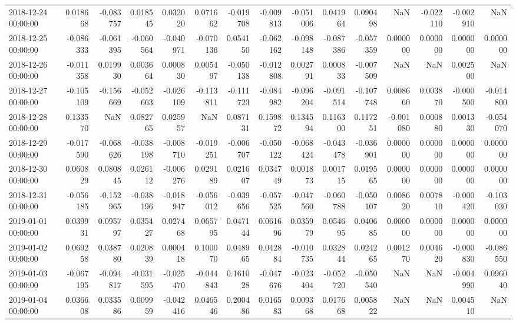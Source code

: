 \begin{tabular}{lrrrrrrrrrrrrrr}
2018-12-24 00:00:00 & 0.018668 & -0.083757 & 0.018545 & 0.032020 & 0.071662 & -0.019708 & -0.009813 & -0.051006 & 0.041964 & 0.090498 & NaN & -0.022110 & -0.002910 & NaN \\
2018-12-25 00:00:00 & -0.086333 & -0.061395 & -0.060564 & -0.040971 & -0.070136 & 0.054150 & -0.062162 & -0.098148 & -0.087386 & -0.057359 & 0.000000 & 0.000000 & 0.000000 & 0.000000 \\
2018-12-26 00:00:00 & -0.011358 & 0.019930 & 0.003664 & 0.000830 & 0.005497 & -0.050138 & -0.012808 & 0.002791 & 0.000833 & -0.007509 & NaN & NaN & 0.002500 & NaN \\
2018-12-27 00:00:00 & -0.105109 & -0.156669 & -0.052663 & -0.026109 & -0.113811 & -0.111723 & -0.084982 & -0.096204 & -0.091514 & -0.107748 & 0.008660 & 0.003870 & -0.000500 & -0.014800 \\
2018-12-28 00:00:00 & 0.133570 & NaN & 0.082765 & 0.025957 & NaN & 0.087131 & 0.159872 & 0.134594 & 0.116300 & 0.117251 & -0.001080 & 0.000880 & 0.001330 & -0.054070 \\
2018-12-29 00:00:00 & -0.017590 & -0.068626 & -0.038198 & -0.008710 & -0.019251 & -0.006707 & -0.050122 & -0.068424 & -0.043478 & -0.036901 & 0.000000 & 0.000000 & 0.000000 & 0.000000 \\
2018-12-30 00:00:00 & 0.060829 & 0.080845 & 0.026112 & -0.006276 & 0.029189 & 0.021607 & 0.034749 & 0.001873 & 0.001715 & 0.019565 & 0.000000 & 0.000000 & 0.000000 & 0.000000 \\
2018-12-31 00:00:00 & -0.056185 & -0.152965 & -0.038196 & -0.018947 & -0.056012 & -0.039656 & -0.057525 & -0.047560 & -0.060788 & -0.050107 & 0.008620 & 0.007810 & -0.000420 & -0.103030 \\
2019-01-01 00:00:00 & 0.039931 & 0.095797 & 0.035427 & 0.027468 & 0.065795 & 0.047144 & 0.061696 & 0.035979 & 0.054695 & 0.040685 & 0.000000 & 0.000000 & 0.000000 & 0.000000 \\
2019-01-02 00:00:00 & 0.069258 & 0.038780 & 0.020839 & 0.000418 & 0.100070 & 0.048965 & 0.042884 & -0.010735 & 0.032844 & 0.024265 & 0.001270 & 0.004620 & -0.000830 & -0.086550 \\
2019-01-03 00:00:00 & -0.067195 & -0.094817 & -0.031595 & -0.025470 & -0.044843 & 0.161028 & -0.047676 & -0.023404 & -0.052720 & -0.050540 & NaN & NaN & -0.004990 & 0.096040 \\
2019-01-04 00:00:00 & 0.036608 & 0.033586 & 0.009959 & -0.042416 & 0.046546 & 0.200486 & 0.016583 & 0.009368 & 0.017668 & 0.005822 & NaN & NaN & 0.004510 & NaN \\

\end{tabular}
